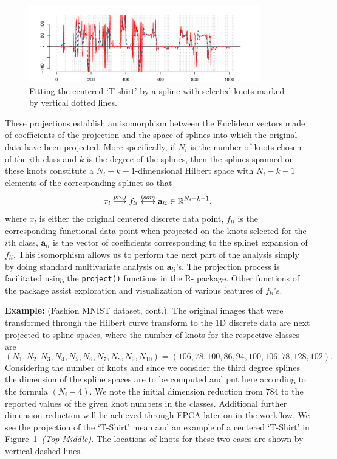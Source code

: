 \begin{enumerate}[leftmargin=0.2cm]
\begin{figure}[t!]
\begin{center}
\includegraphics[width=0.9\textwidth]{figures/Fig7T-shirtfit.pdf}  
\end{center}
\caption{\footnotesize  Fitting the centered `T-shirt' by a spline with selected knots  marked by vertical dotted lines.}
  \label{fig:KnotSelMean}
\end{figure}
These projections establish an isomorphism between the Euclidean vectors made of coefficients of the projection and the space of splines into which the original data have been projected. 
More specifically, if $N_i$ is the number of knots chosen of the $i$th class and $k$ is the {  degree} of the splines, then the splines spanned on these knots constitute a $N_i-k-1$-dimensional Hilbert space with $N_i-k-1$ elements of the corresponding splinet so that 
\begin{equation}
\label{eq:isom}
x_l\stackrel{\tiny proj}{\longmapsto} f_{li} \stackrel{\tiny isom}{\longleftrightarrow} \mathbf a_{li}\in \mathbb R^{N_i-k-1},
\end{equation}
where $x_l$ is either the original centered discrete data point, $f_{li}$ is the corresponding functional data point when projected on the knots selected for the $i$th class, $\mathbf a_{li}$ is the vector of coefficients corresponding to the splinet expansion of $f_{li}$. 
This isomorphism allows us to perform the next part of the analysis simply by doing standard multivariate analysis on $\mathbf a_{li}$'s.
The projection process is facilitated using the {\tt project()} functions in the R- package.
Other functions of the package assist exploration and visualization of various features of $f_{li}$'s.

\noindent\textbf{Example:} (Fashion MNIST dataset, cont.). The original images that were transformed through the Hilbert curve transform to the 1D discrete data are next projected to spline spaces, { where the number of knots for the respective classes are 
    $$
    (N_1,N_2,N_3,N_4,N_5,N_6,N_7,N_8,N_9,N_{10})=(106 , 78, 100 ,86, 94, 100, 106,  78, 128, 102).
    $$ }
    Considering the number of knots and since we consider the third {  degree}  splines the dimension of the spline spaces are to be computed and put here according to the formula $(N_i-4)$. We note the initial dimension reduction from $784$ to the reported values of the given knot numbers in the classes. Additional further dimension reduction will be achieved through FPCA later on in the workflow.  We see the projection of the `T-Shirt' mean and an example of a  centered `T-Shirt' in Figure~\ref{fig:KnotSelMean}~\emph{(Top-Middle)}. The locations of knots for these two cases are shown by vertical dashed lines.     
    

\end{enumerate}
